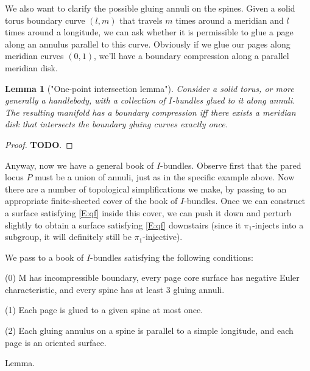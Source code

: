 \documentclass[12pt]{amsart}
\newtheorem{lemma}[theorem]{Lemma}
\theoremstyle{definition}
\theoremstyle{remark}
\begin{document}
We also want to clarify the possible gluing annuli on the spines. Given a solid
torus boundary curve $(l,m)$ that travels $m$ times around a meridian and $l$
times around a longitude, we can ask whether it is permissible to glue a page
along an annulus parallel to this curve. Obviously if we glue our pages along
meridian curves $(0,1)$, we'll have a boundary compression along a parallel
meridian disk.


\begin{lemma}["One-point intersection lemma"]

Consider a solid torus, or more generally a handlebody, with a collection of
$I$-bundles glued to it along annuli. The resulting manifold has a boundary
compression iff there exists a meridian disk that intersects the boundary
gluing curves exactly once.

\end{lemma}

\begin{proof}

{\bf TODO}.

\end{proof}

Anyway, now we have a general book of $I$-bundles. Observe first that the pared
locus $P$ must be a union of annuli, just as in the specific example above.  Now
there are a number of topological simplifications we make, by passing to an
appropriate finite-sheeted cover of the book of $I$-bundles.  Once we can
construct a surface satisfying \eqref{E:qf} inside this cover, we can push it down and
perturb slightly to obtain a surface satisfying \eqref{E:qf} downstairs (since
it $\pi_1$-injects into a subgroup, it will definitely still be
$\pi_1$-injective).

We pass to a book of $I$-bundles satisfying the following conditions:

(0) M has incompressible boundary, every page core surface has negative Euler
characteristic, and every spine has at least 3 gluing annuli.

(1) Each page is glued to a given spine at most once.

(2) Each gluing annulus on a spine is parallel to a simple longitude, and each
page is an oriented surface.

Lemma.
\end{document}

